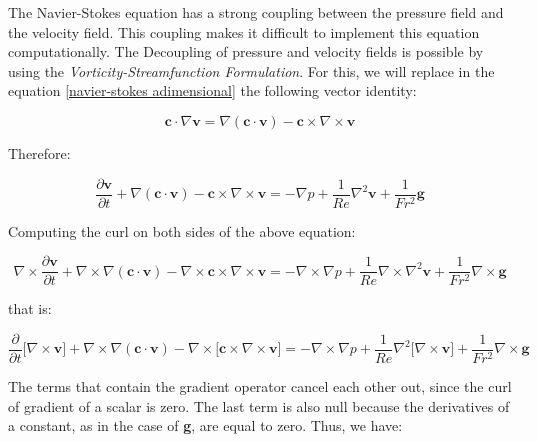 The Navier-Stokes equation has a strong coupling between
 the pressure field and the velocity field.
 This coupling makes it difficult to implement this
 equation computationally. The Decoupling of pressure
 and velocity fields is possible by using the
 \textit{Vorticity-Streamfunction Formulation}.
 For this, we will replace in the equation
 \ref{navier-stokes adimensional} the following vector identity:

\begin{equation}
 \textbf{c} \cdot \nabla \textbf{v}
 = 
 \nabla \left( \textbf{c} \cdot \textbf{v} \right)
 - 
 \textbf{c} \times \nabla \times \textbf{v}
\end{equation}

\medskip
\noindent
Therefore:

\begin{equation}
 \frac{\partial \textbf{v}}{\partial t} 
 + 
 \nabla \left( \textbf{c} \cdot \textbf{v} \right)
 - 
 \textbf{c} \times \nabla \times \textbf{v}
 =
 -
 \nabla p
 +
 \frac{1}{Re} \nabla^{2} \textbf{v}
 +
 \frac{1}{Fr^{2}} \textbf{g}
\end{equation}

\medskip
\noindent
Computing the curl on both sides of the above equation:

\begin{equation}
 \nabla \times \frac{\partial \textbf{v}}{\partial t} 
 + 
 \nabla \times \nabla \left( \textbf{c} \cdot \textbf{v} \right)
 - 
 \nabla \times \textbf{c} \times \nabla \times \textbf{v}
 =
 -
 \nabla \times \nabla p
 +
 \frac{1}{Re} \nabla \times \nabla^{2} \textbf{v}
 +
 \frac{1}{Fr^{2}} \nabla \times \textbf{g}
\end{equation}

\medskip
\noindent
that is:

\begin{equation}
 \frac{\partial}{\partial t} \big[ \nabla \times \textbf{v} \big]
 + 
 \nabla \times \nabla \left( \textbf{c} \cdot \textbf{v} \right)
 - 
 \nabla \times \big[ \textbf{c} \times \nabla \times \textbf{v} \big]
 =
 -
 \nabla \times \nabla p
 +
 \frac{1}{Re} \nabla^{2} \big[ \nabla \times \textbf{v} \big]
 +
 \frac{1}{Fr^{2}} \nabla \times \textbf{g}
\end{equation}

\medskip
The terms that contain the gradient operator cancel
 each other out, since the curl of gradient of a scalar is zero.
 The last term is also null because the derivatives of a constant,
 as in the case of \textbf{g}, are equal to zero. Thus, we have:

